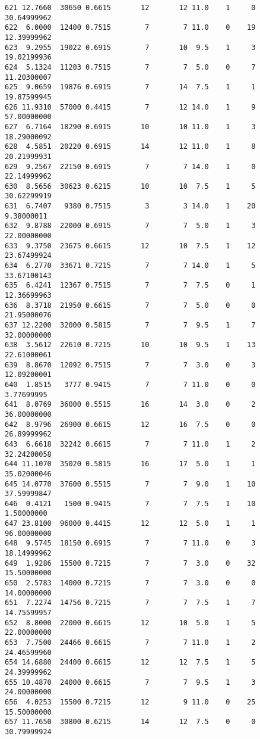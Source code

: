 \documentclass[
  letterpaper,
  DIV=11,
  numbers=noendperiod]{scrreprt}
\begin{document}
\begin{verbatim}
621 12.7660  30650 0.6615       12       12 11.0    1     0 30.64999962
622  6.0000  12400 0.7515        7        7 11.0    0    19 12.39999962
623  9.2955  19022 0.6915        7       10  9.5    1     3 19.02199936
624  5.1324  11203 0.7515        7        7  5.0    0     7 11.20300007
625  9.0659  19876 0.6915        7       14  7.5    1     1 19.87599945
626 11.9310  57000 0.4415        7       12 14.0    1     9 57.00000000
627  6.7164  18290 0.6915       10       10 11.0    1     3 18.29000092
628  4.5851  20220 0.6915       14       12 11.0    1     8 20.21999931
629  9.2567  22150 0.6915        7        7 14.0    1     0 22.14999962
630  8.5656  30623 0.6215       10       10  7.5    1     5 30.62299919
631  6.7407   9380 0.7515        3        3 14.0    1    20  9.38000011
632  9.8788  22000 0.6915        7        7  5.0    1     3 22.00000000
633  9.3750  23675 0.6615       12       10  7.5    1    12 23.67499924
634  6.2770  33671 0.7215        7        7 14.0    1     5 33.67100143
635  6.4241  12367 0.7515        7        7  7.5    0     1 12.36699963
636  8.3718  21950 0.6615        7        7  5.0    0     0 21.95000076
637 12.2200  32000 0.5815        7        7  9.5    1     7 32.00000000
638  3.5612  22610 0.7215       10       10  9.5    1    13 22.61000061
639  8.8670  12092 0.7515        7        7  3.0    0     3 12.09200001
640  1.8515   3777 0.9415        7        7 11.0    0     0  3.77699995
641  8.0769  36000 0.5515       16       14  3.0    0     2 36.00000000
642  8.9796  26900 0.6615       12       16  7.5    0     0 26.89999962
643  6.6618  32242 0.6615        7        7 11.0    1     2 32.24200058
644 11.1070  35020 0.5815       16       17  5.0    1     1 35.02000046
645 14.0770  37600 0.5515        7        7  9.0    1    10 37.59999847
646  0.4121   1500 0.9415        7        7  7.5    1    10  1.50000000
647 23.8100  96000 0.4415       12       12  5.0    1     1 96.00000000
648  9.5745  18150 0.6915        7        7 11.0    0     3 18.14999962
649  1.9286  15500 0.7215        7        7  3.0    0    32 15.50000000
650  2.5783  14000 0.7215        7        7  3.0    0     0 14.00000000
651  7.2274  14756 0.7215        7        7  7.5    1     7 14.75599957
652  8.8000  22000 0.6615       12       10  5.0    1     5 22.00000000
653  7.7500  24466 0.6615        7        7 11.0    1     2 24.46599960
654 14.6880  24400 0.6615       12       12  7.5    1     5 24.39999962
655 10.4870  24000 0.6615        7        7  9.5    1     3 24.00000000
656  4.0253  15500 0.7215       12        9 11.0    0    25 15.50000000
657 11.7650  30800 0.6215       14       12  7.5    0     0 30.79999924

\end{verbatim}
\end{document}
